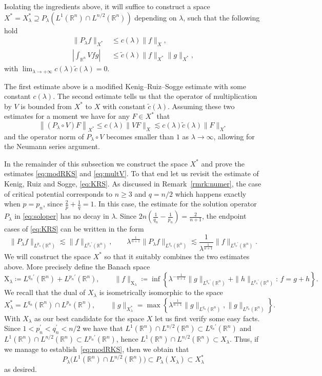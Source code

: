 \documentclass[11pt,a4paper]{amsart}
\theoremstyle{remark}
\theoremstyle{definition}
\newcommand{\R}{\mathbb{R}}
\newcommand{\X}{\mathrm{X}}
\begin{document}
Isolating the ingredients above, it will suffice to construct a space $X^*=X^* _\lambda \supseteq P_\lambda(L^1(\R^n)\cap L^{n/2}(\R^n))$ depending on $\lambda$, such that the following hold
\begin{align}\label{eq:modRKS}
\|P_\lambda f\|_{X^*}&\leq c(\lambda) \|f\|_{X},      
\\ \label{eq:multV}
\left|\int_{\R^n} V f g\right|&\leq \tilde c(\lambda) \|f\|_{X^*} \|g\|_{X^*},
\end{align}
with $\lim_{\lambda\to +\infty}c(\lambda)\tilde c(\lambda)=0$.

The first estimate above is a modified Kenig--Ruiz--Sogge estimate with some constant $c(\lambda)$. The second estimate  tells us that the operator of multiplication by $V$ is bounded from $X^*$ to $X$ with constant $\tilde c(\lambda)$.  Assuming these two estimates for a moment we have for any $F\in X^*$ that
\[
\left\|(P_\lambda \circ V)F\right\|_{X^*} \leq c(\lambda) \|VF\|_{X}\lesssim c(\lambda)\tilde c(\lambda)\|F\|_{X^*}
\]
and the operator norm of $P_\lambda\circ V$ becomes smaller than $1$ as $\lambda\to \infty$, allowing for the Neumann series argument.

In the remainder of this subsection we construct the space $X^*$ and prove the estimates \eqref{eq:modRKS} and \eqref{eq:multV}. To that end let us revisit the estimate of Kenig, Ruiz and Sogge, \eqref{eq:KRS}. As discussed in Remark~\ref{rmrk:numer}, the case of critical potential corresponds to $n\geq 3$ and  $q=n/2$ which happens exactly when $p=p_n$, since $\frac{2}{p}+\frac{1}{q}=1$. In this case, the estimate for the solution operator $P_\lambda$ in \eqref{eq:soloper} has no decay in $\lambda$. Since $2n(\frac{1}{q_n}-\frac{1}{p_n})=\frac{2}{n+1}$, the endpoint cases of \eqref{eq:KRS} can be written in the form
\[
      \|P_\lambda f\|_{L^{p_n}(\R^n)}\lesssim \|f\|_{L^{p_n '}(\R^n)},\qquad
     \lambda^{\frac{1}{n+1}} \|P_\lambda f\|_{L^{q_n}(\R^n)}\lesssim \frac{1}{\lambda^\frac{1}{n+1}}\|f\|_{L^{q_n '}(\R^n)}.
\]
We will construct the space $X^*$ so that it suitably combines the two estimates above. More precisely define the Banach space
\[
\X_\lambda \coloneqq L^{q_n'}(\R^n)+L^{p_n'}(\R^n) ,\qquad  \| f \|_{\X_\lambda} \coloneqq \inf \left\{ \lambda^{- \frac{1}{n+1}} \| g\|_{L^{q_n'}(\R^n)} + \| h\|_{L^{p_n'}(\R^n)} : \, f = g+h \right\}.
\]
We recall that the dual of $X_\lambda$ is isometrically isomorphic to the space
\[
X_{\lambda} ^*=  L^{q_n}(\R^n) \cap L^{p_n}(\R^n),\qquad \|g\|_{X_\lambda ^*} =\max\left\{ \lambda^{\frac{1}{n+1}} \| g \|_{L^{q_n}(\R^n)}, \| g \|_{L^{p_n}(\R^n)} \right\} .      
\]
 With $X_\lambda$ as our best candidate for the space $X$ let us first verify some easy facts. Since $1<p_n^\prime <q_n^\prime<n/2$ we have that $ L^1(\R^n)\cap L^{n/2}(\R^n) \subset L^{q_n'}(\R^n)$ and $ L^1(\R^n)\cap L^{n/2}(\R^n) \subset L^{p_n'}(\R^n)$, hence $L^1(\R^n)\cap L^{n/2}(\R^n)\subset X_\lambda$. Thus, if we manage to establish~\eqref{eq:modRKS}, then we obtain that
\[
P_\lambda \big(L^1(\R^n)\cap L^{n/2}(\R^n)\big)\subset P_\lambda(X_\lambda ) \subset X_\lambda ^*
\]
as desired. 
\end{document}
